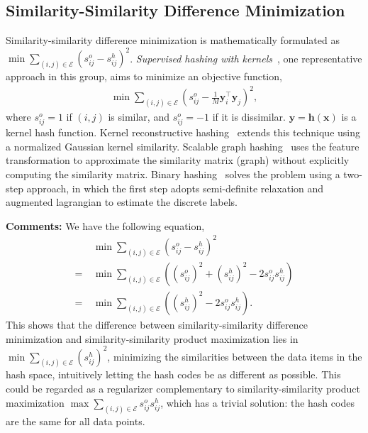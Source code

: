 \documentclass[10pt,journal,compsoc]{IEEEtran}
\begin{document}
\subsection{Similarity-Similarity Difference Minimization}
Similarity-similarity difference minimization
is mathematically
formulated as
$\operatorname{min}\sum_{(i,j) \in \mathcal{E}}(s_{ij}^o-s_{ij}^h)^2$.
\emph{Supervised hashing with kernels}~\cite{LiuWJJC12},
one representative approach in this group,
aims to minimize an objective function,
\begin{align}
\min\sum\nolimits_{(i,j) \in \mathcal{E}} (s^o_{ij}  - \frac{1}{M}\mathbf{y}_i^\top\mathbf{y}_j)^2,\label{eqn:objectiveFunctionForHashwithKernelsWeiLiu}
\end{align}
where $s^o_{ij} = 1$ if $(i,j)$ is similar,
and $s^o_{ij} = -1$ if it is dissimilar.
$\mathbf{y} = \mathbf{h}(\mathbf{x})$
is a kernel hash function.
Kernel reconstructive hashing~\cite{YangBZRZC14}
extends this technique
using a normalized Gaussian kernel similarity.
Scalable graph hashing~\cite{JiangL15}
uses the feature transformation to
approximate the similarity matrix (graph)
without explicitly computing the similarity matrix.
Binary hashing~\cite{DoDNC16} solves the problem
using a two-step approach,
in which the first step adopts semi-definite relaxation
and augmented lagrangian to estimate the discrete labels.


\textbf{Comments:}
We have the following equation,
\begin{align}
&~ \operatorname{min}\sum\nolimits_{(i,j) \in \mathcal{E}}(s_{ij}^o-s_{ij}^h)^2 \\
=&~ \operatorname{min}\sum\nolimits_{(i,j) \in \mathcal{E}}((s_{ij}^o)^2 + (s_{ij}^h)^2 - 2 s_{ij}^o s_{ij}^h) \\
=&~ \operatorname{min}\sum\nolimits_{(i,j) \in \mathcal{E}}((s_{ij}^h)^2 - 2 s_{ij}^o s_{ij}^h).
\end{align}
This shows that the difference between similarity-similarity difference minimization
and similarity-similarity product maximization
lies in $\operatorname{min} \sum_{(i,j) \in \mathcal{E}}(s_{ij}^h)^2$,
minimizing the similarities between the data items in the hash space,
intuitively
letting the hash codes be as different as possible.
This could be regarded as a regularizer
complementary to similarity-similarity product maximization $\operatorname{max}\sum_{(i,j) \in \mathcal{E}} s_{ij}^o s_{ij}^h$,
which has a trivial solution: the hash codes are the same for all data points.
\end{document}
